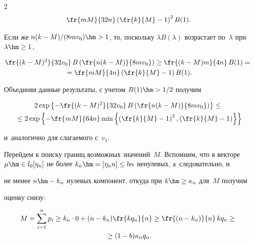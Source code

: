 \begin{multicols}{2}
\begin{multline*}
\fr{mM}{32n} \left(\fr{k}{M}-1\right)^2 B(1).

\end{multline*}

Если же $n(k-M)/(8mv_0)\hm > 1$, то, поскольку $\lambda B(\lambda)$ возрастает по~$\lambda$ при $\lambda\hm\geq1$,

\begin{multline*}

\fr{(k-M)^2}{32 v_0}\, B\left(\fr{n(k-M)}{8m v_0}\right) \geq  \fr{(k-M) m}{4n}\, B(1) ={}\\

{}=  \fr{mM}{4n} \left(\fr{k}{M}-1\right) B(1).

\end{multline*}

Объединяя данные результаты, с учетом $B(1)\hm>1/2$ получим



\noindent

\begin{multline*}

2 \exp\left\{-\fr{(k-M)^2}{32 v_0}\, B\left(\fr{n(k-M)}{8m  v_0}\right)\right\} \leq{}\\

{}\leq 2 \exp\left\{-\fr{mM}{64n}

\min\left\{\left(\fr{k}{M}-1\right)^2,\left(\fr{k}{M}- 1\right)\right\}\right\}

\end{multline*}

и~аналогично для слагаемого с~$v_1$.



Перейдем к поиску границ возможных значений~$M$. Вспомним, что в векторе $\mu\hm\in 

l_0[\eta_n]$ не более $k_n \hm= [\eta_n n] \leq bn$ ненулевых, а~следовательно, и 

не менее $n\hm-k_n$ нулевых компонент, откуда при $k\hm\geq \kappa_n$ для~$M$ получим 

оценку снизу:

\begin{multline*}

M = \sum\limits_{i=1}^n p_i \geq k_n \cdot 0 + (n-k_n)  \fr{kq_n}{n} 

\geq   \fr{(n-k_n)}{n}\, kq_n \geq{}\\

{}\geq (1-b)\kappa_n q_n.

\end{multline*}


\end{multicols}

